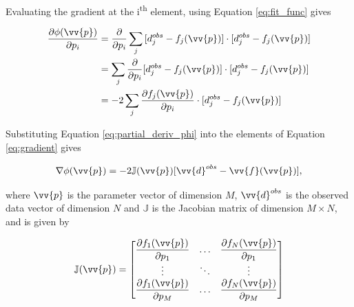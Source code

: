 Evaluating the gradient at the i\textsuperscript{th} element, using Equation \ref{eq:fit_func} gives

\begin{equation} \label{eq:partial_deriv_phi}
\begin{aligned}
    \dfrac{\partial \phi(\vv{p})}{\partial p_i} &= 
    \dfrac{\partial}{\partial p_i} \sum_j{
    [d_j^{obs} - f_j(\vv{p})]\cdot[d_j^{obs} - f_j(\vv{p})]
    } \\
    &= \sum_j{\dfrac{\partial}{\partial p_i} 
    [d_j^{obs} - f_j(\vv{p})]\cdot[d_j^{obs} - f_j(\vv{p})]
    } \\
    &= -2\sum_j{\dfrac{\partial f_j(\vv{p})}{\partial p_i}\cdot[d_j^{obs} - f_j(\vv{p})]
    }
\end{aligned}
\end{equation}

Substituting Equation \ref{eq:partial_deriv_phi} into the elements of Equation \ref{eq:gradient} gives


\begin{equation}
    \nabla\phi(\vv{p}) = 
     -2 \mathbb{J}(\vv{p})  [\vv{d}^{obs} - \vv{f}(\vv{p})],
\end{equation}

\noindent
where $\vv{p}$ is the parameter vector of dimension $M$, $\vv{d}^{obs}$ is the observed data vector of dimension $N$ and $\mathbb{J}$ is the Jacobian matrix of dimension $M \times N$, and is given by

\begin{equation}
\mathbb{J}(\vv{p}) =
\begin{bmatrix}
    \dfrac{\partial f_1(\vv{p})}{\partial p_1} &
        \ldots &
        \dfrac{\partial f_N(\vv{p})}{\partial p_1}
    \\
    \vdots & \ddots & \vdots 
    \\
    \dfrac{\partial f_1(\vv{p})}{\partial p_M} &
        \ldots &
        \dfrac{\partial f_N(\vv{p})}{\partial p_M}
\end{bmatrix}
\label{eq:jacobian}
\end{equation}

